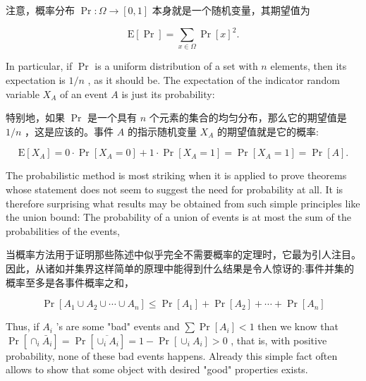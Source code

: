 \documentclass[10pt]{article}
\begin{document}
\begin{tcolorbox}\relax
注意，概率分布 \(\Pr  : \Omega  \rightarrow  \left\lbrack  {0,1}\right\rbrack\) 本身就是一个随机变量，其期望值为
\end{tcolorbox}

\[
\mathrm{E}\left\lbrack  \Pr \right\rbrack   = \mathop{\sum }\limits_{{x \in  \Omega }}\Pr {\left\lbrack  x\right\rbrack  }^{2}.
\]

In particular, if \(\Pr\) is a uniform distribution of a set with \(n\) elements, then its expectation is \(1/n\) , as it should be. The expectation of the indicator random variable \({X}_{A}\) of an event \(A\) is just its probability:

\begin{tcolorbox}\relax
特别地，如果 \(\Pr\) 是一个具有 \(n\) 个元素的集合的均匀分布，那么它的期望值是 \(1/n\) ，这是应该的。事件 \(A\) 的指示随机变量 \({X}_{A}\) 的期望值就是它的概率:
\end{tcolorbox}

\[
\mathrm{E}\left\lbrack  {X}_{A}\right\rbrack   = 0 \cdot  \Pr \left\lbrack  {{X}_{A} = 0}\right\rbrack   + 1 \cdot  \Pr \left\lbrack  {{X}_{A} = 1}\right\rbrack   = \Pr \left\lbrack  {{X}_{A} = 1}\right\rbrack   = \Pr \left\lbrack  A\right\rbrack  .
\]

The probabilistic method is most striking when it is applied to prove theorems whose statement does not seem to suggest the need for probability at all. It is therefore surprising what results may be obtained from such simple principles like the union bound: The probability of a union of events is at most the sum of the probabilities of the events,

\begin{tcolorbox}\relax
当概率方法用于证明那些陈述中似乎完全不需要概率的定理时，它最为引人注目。因此，从诸如并集界这样简单的原理中能得到什么结果是令人惊讶的:事件并集的概率至多是各事件概率之和，
\end{tcolorbox}

\[
\Pr \left\lbrack  {{A}_{1} \cup  {A}_{2} \cup  \cdots  \cup  {A}_{n}}\right\rbrack   \leq  \Pr \left\lbrack  {A}_{1}\right\rbrack   + \Pr \left\lbrack  {A}_{2}\right\rbrack   + \cdots  + \Pr \left\lbrack  {A}_{n}\right\rbrack \tag{3.3}
\]

Thus, if \({A}_{i}\) ’s are some "bad" events and \(\sum \Pr \left\lbrack  {A}_{i}\right\rbrack   < 1\) then we know that \(\Pr \left\lbrack  {{ \cap  }_{i}{\bar{A}}_{i}}\right\rbrack   = \Pr \left\lbrack  \overline{{ \cup  }_{i}{A}_{i}}\right\rbrack   = 1 - \Pr \left\lbrack  {{ \cup  }_{i}{A}_{i}}\right\rbrack   > 0\) , that is, with positive probability, none of these bad events happens. Already this simple fact often allows to show that some object with desired "good" properties exists.
\end{document}
